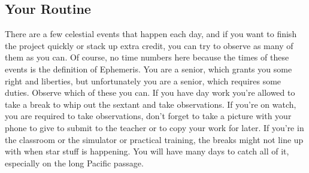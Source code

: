 \documentclass[letterpaper,12pt]{article}
\begin{document}
\subsection{Your Routine}
There are a few celestial events that happen each day, and if you want to finish the project quickly or stack up extra credit, you can try to observe as many of them as you can. Of course, no time numbers here because the times of these events is the definition of Ephemeris. You are a senior, which grants you some right and liberties, but unfortunately you are a senior, which requires some duties. Observe which of these you can. If you have day work you're allowed to take a break to whip out the sextant and take observations. If you're on watch, you are required to take observations, don't forget to take a picture with your phone to give to submit to the teacher or to copy your work for later. If you're in the classroom or the simulator or practical training, the breaks might not line up with when star stuff is happening. You will have many days to catch all of it, especially on the long Pacific passage.
\end{document}
